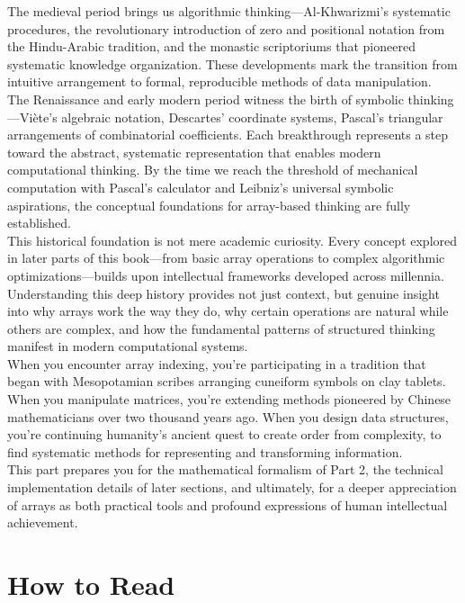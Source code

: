 The medieval period brings us algorithmic thinking—Al-Khwarizmi's systematic procedures, the revolutionary introduction of zero and positional notation from the Hindu-Arabic tradition, and the monastic scriptoriums that pioneered systematic knowledge organization. These developments mark the transition from intuitive arrangement to formal, reproducible methods of data manipulation.\\
The Renaissance and early modern period witness the birth of symbolic thinking—Viète's algebraic notation, Descartes' coordinate systems, Pascal's triangular arrangements of combinatorial coefficients. Each breakthrough represents a step toward the abstract, systematic representation that enables modern computational thinking. By the time we reach the threshold of mechanical computation with Pascal's calculator and Leibniz's universal symbolic aspirations, the conceptual foundations for array-based thinking are fully established.\\
This historical foundation is not mere academic curiosity. Every concept explored in later parts of this book—from basic array operations to complex algorithmic optimizations—builds upon intellectual frameworks developed across millennia. Understanding this deep history provides not just context, but genuine insight into why arrays work the way they do, why certain operations are natural while others are complex, and how the fundamental patterns of structured thinking manifest in modern computational systems.\\
When you encounter array indexing, you're participating in a tradition that began with Mesopotamian scribes arranging cuneiform symbols on clay tablets. When you manipulate matrices, you're extending methods pioneered by Chinese mathematicians over two thousand years ago. When you design data structures, you're continuing humanity's ancient quest to create order from complexity, to find systematic methods for representing and transforming information.\\
This part prepares you for the mathematical formalism of Part 2, the technical implementation details of later sections, and ultimately, for a deeper appreciation of arrays as both practical tools and profound expressions of human intellectual achievement.
\newpage
\section*{How to Read}

